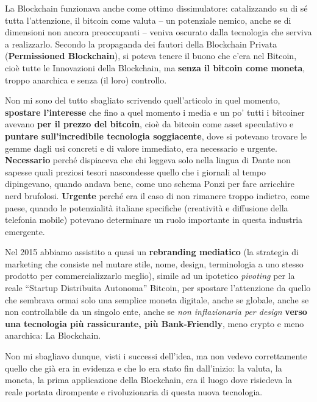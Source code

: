 \documentclass[a4paper,12pt,italian]{article}
\begin{document}
La Blockchain funzionava anche come ottimo dissimulatore: catalizzando su di sé tutta l’attenzione, il bitcoin come valuta -- un potenziale nemico, anche se di dimensioni non ancora preoccupanti -- veniva oscurato dalla tecnologia che serviva a
realizzarlo. Secondo la propaganda dei fautori della Blockchain Privata (\textbf{Permissioned Blockchain}),
si poteva tenere il buono che c’era nel Bitcoin, cioè tutte le Innovazioni della Blockchain, ma \textbf{senza
il bitcoin come moneta}, troppo anarchica e senza (il loro) controllo.

\smallskip



Non mi sono del tutto sbagliato scrivendo quell’articolo in quel momento, \textbf{spostare
l’interesse} che fino a quel momento i media e un po’ tutti i bitcoiner avevano \textbf{per il prezzo
del bitcoin}, cioè da bitcoin come asset speculativo e \textbf{puntare sull’incredibile tecnologia
soggiacente}, dove si potevano trovare le gemme dagli usi concreti e di valore immediato, era necessario e
urgente. \textbf{Necessario} perché dispiaceva che chi leggeva solo nella lingua di Dante non sapesse
quali preziosi tesori nascondesse quello che i giornali al tempo dipingevano, quando andava bene, come uno schema Ponzi
per fare arricchire nerd brufolosi. \textbf{Urgente} perché era il caso di non rimanere troppo indietro, come paese,
 quando le potenzialità italiane specifiche (creatività e diffusione della telefonia mobile) potevano determinare 
 un ruolo importante in questa industria emergente.


\bigskip


Nel 2015 abbiamo assistito a quasi un \textbf{rebranding mediatico} (la strategia di marketing
che consiste nel mutare stile, nome, design, terminologia a uno stesso prodotto per commercializzarlo meglio)​, simile ad un ipotetico
\textit{pivoting} per la reale “Startup Distribuita Autonoma” Bitcoin, per spostare l’attenzione da quello che sembrava ormai
solo una semplice moneta digitale, anche se globale, anche se non controllabile da un singolo ente, anche se \textit{non
inflazionaria per design} \textbf{verso una tecnologia più rassicurante, più Bank-Friendly}, meno
crypto e meno anarchica: La Blockchain.



Non mi sbagliavo dunque, visti i successi dell’idea, ma non vedevo correttamente quello che già era in evidenza e
che lo era stato fin dall’inizio: la valuta, la moneta, la prima applicazione della Blockchain, era il luogo dove
risiedeva la reale portata dirompente e rivoluzionaria di questa nuova tecnologia.
\end{document}
